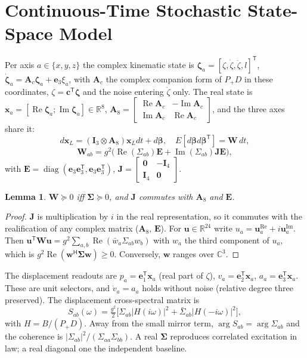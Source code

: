 \documentclass[conference]{IEEEtran}
\DeclareRobustCommand{\vct}[1]{\bm{#1}}
\DeclareRobustCommand{\mat}[1]{\bm{#1}}
\newcommand{\R}{\mathbb{R}}
\newcommand{\C}{\mathbb{C}}
\newcommand{\Hr}{^{\mathsf H}}
\newcommand{\T}{^{\mathsf T}}
\theoremstyle{bodysmall}
\newtheorem{lemma}{Lemma}
\begin{document}
\section{Continuous-Time Stochastic State-Space Model}
Per axis $a\in\{x,y,z\}$ the complex kinematic state is
$\vct\zeta_a=[\zeta,\dot\zeta,\ddot\zeta,l]\T$, $\dot{\vct\zeta}_a=\mat A_c\vct\zeta_a+\vct e_3\xi_a$,
with $\mat A_c$ the complex companion form of $P_+D$ in these coordinates,
$\zeta=\vct c\T\vct\zeta$ and the noise entering $\ddot\zeta$ only. The real
state is $\vct x_a=[\operatorname{Re}\vct\zeta_a;\operatorname{Im}\vct\zeta_a]\in\R^8$,
$\mat A_8=\left[\begin{smallmatrix}\operatorname{Re}\mat A_c&-\operatorname{Im}\mat A_c\\
\operatorname{Im}\mat A_c&\operatorname{Re}\mat A_c\end{smallmatrix}\right]$,
and the three axes share it:
\begin{equation}
d\vct x_L=(\mat I_3\otimes\mat A_8)\vct x_Ldt+d\vct\beta,\quad
E[d\vct\beta d\vct\beta\T]=\mat W\,dt,
\label{eq:sde}
\end{equation}
\begin{equation}
\mat W_{ab}=g^2\bigl(\operatorname{Re}(\Sigma_{ab})\mat E+\operatorname{Im}(\Sigma_{ab})\mat J\mat E\bigr),
\label{eq:W}
\end{equation}
with $\mat E=\operatorname{diag}(\vct e_3\vct e_3\T,\vct e_3\vct e_3\T)$,
$\mat J=\left[\begin{smallmatrix}\mat 0&-\mat I_4\\\mat I_4&\mat 0\end{smallmatrix}\right]$.
\begin{lemma}
\label{lem:W}
$\mat W\succeq0$ iff $\mat\Sigma\succeq0$, and $\mat J$ commutes with $\mat A_8$
and $\mat E$.
\end{lemma}
\begin{proof}
$\mat J$ is multiplication by $i$ in the real representation, so it commutes
with the realification of any complex matrix ($\mat A_8$, $\mat E$). For
$\vct u\in\R^{24}$ write $u_a=\vct u_a^{\mathrm{Re}}+i\vct u_a^{\mathrm{Im}}$.
Then $\vct u\T\mat W\vct u=g^2\sum_{a,b}\operatorname{Re}(\bar w_a\Sigma_{ab}w_b)$
with $w_a$ the third component of $u_a$, which is
$g^2\operatorname{Re}(\vct w\Hr\mat\Sigma\vct w)\ge0$. Conversely, $\vct w$
ranges over $\C^3$.
\end{proof}
The displacement readouts are $p_a=\vct e_1\T\vct x_a$ (real part of
$\zeta$), $v_a=\vct e_2\T\vct x_a$, $a_a=\vct e_3\T\vct x_a$. These are unit
selectors, and $\dot v_a=a_a$ holds without noise (relative degree three
preserved). The displacement cross-spectral matrix is
\begin{equation}
S_{ab}(\omega)=\tfrac{g^2}{2}\bigl[\Sigma_{ab}|H(i\omega)|^2+\bar\Sigma_{ab}|H(-i\omega)|^2\bigr],
\label{eq:S}
\end{equation}
with $H=B/(P_+D)$. Away from the small mirror term, $\arg S_{ab}=\arg\Sigma_{ab}$
and the coherence is $|\Sigma_{ab}|^2/(\Sigma_{aa}\Sigma_{bb})$. A real
$\mat\Sigma$ reproduces correlated excitation in law; a real diagonal one the
independent baseline.
\end{document}
